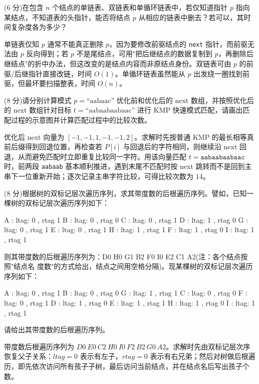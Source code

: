 \begin{question}
(6 分)在包含 $n$ 个结点的单链表、双链表和单循环链表中，若仅知道指针 $p$ 指向某结点，不知道表的头指针，能否将结点 $p$ 从相应的链表中删去？若可以，其时间复杂度各为多少？
\begin{solution}
单链表仅知 $p$ 通常不能真正删除 $p$，因为要修改前驱结点的 \texttt{next} 指针，而前驱无法由 $p$ 反向得到；若 $p$ 不是尾结点，可用"把后继结点的数据复制到 $p$，再删除后继结点"的折中办法，但这改变的是结点内容而非原结点身份。双链表可由 $p$ 的前驱/后继指针直接改链，时间 $O(1)$。单循环链表虽然能从 $p$ 出发绕一圈找到前驱，但最坏要扫描整表，时间 $O(n)$。
\end{solution}
\end{question}

\begin{question}
(8 分)请分别计算模式 $p = \text{``aabaac''}$ 优化前和优化后的 next 数组，并按照优化后的 next 数组针对目标 $t = \text{``aabaabaabaac''}$ 进行 KMP 快速模式匹配，请画出匹配过程的示意图并计算匹配过程中的比较次数。
\begin{solution}
优化后 next 向量为 $[-1,-1,1,-1,-1,2]$。求解时先按普通 KMP 的最长相等真前后缀得到回退位置，再检查若 $P[i]$ 与回退后的字符相同，则继续沿 next 回退，从而避免匹配时立即重复比较同一字符。用该向量匹配 $t=\texttt{aabaabaabaac}$ 时，前两段 \texttt{aabaab} 基本顺利推进，遇到末尾不匹配时按 next 跳转而不是回到主串下一位重新开始；逐次记录主串字符比较，可得比较次数为 $14$。
\end{solution}
\end{question}

\begin{question}
(8 分)根据树的双标记层次遍历序列，求其带度数的后根遍历序列。譬如，已知一棵树的双标记层次遍历序列如下：
\begin{ttbox}
A : ltag: 0 , rtag 1
B : ltag: 0 , rtag 0
C : ltag: 0 , rtag 1
D : ltag: 1 , rtag 0
G : ltag: 0 , rtag 1
E : ltag: 0 , rtag 1
H : ltag: 1 , rtag 1
F : ltag: 1 , rtag 0
I : ltag: 1 , rtag 1
\end{ttbox}
则其带度数的后根遍历序列为：D0 H0 G1 B2 F0 I0 E2 C1 A2(注：各个结点按照"结点名 度数"的方式给出，结点之间用空格分隔)。现某棵树的双标记层次遍历序列如下：
\begin{ttbox}
A : ltag: 0 , rtag 1
B : ltag: 0 , rtag 0
G : ltag: 1 , rtag 1
C : ltag: 0 , rtag 0
F : ltag: 0 , rtag 1
D : ltag: 1 , rtag 0
E : ltag: 1 , rtag 1
H : ltag: 1 , rtag 0
I : ltag: 1 , rtag 1
\end{ttbox}
请给出其带度数的后根遍历序列。
\begin{solution}
带度数后根遍历序列为 $D0\ E0\ C2\ H0\ I0\ F2\ B2\ G0\ A2$。求解时先由双标记层次序恢复父子关系：$ltag=0$ 表示有左子，$rtag=0$ 表示有右兄弟；然后对树做后根遍历，即先依次访问所有孩子子树，最后访问当前结点，并在结点名后写出孩子个数。
\end{solution}
\end{question}

